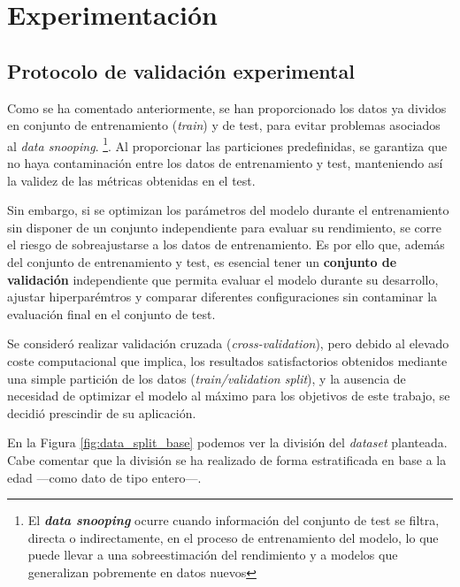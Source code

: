 \chapter{Experimentación}


\section{Protocolo de validación experimental}

Como se ha comentado anteriormente, se han proporcionado los datos ya dividos en conjunto de entrenamiento
(\textit{train}) y de test, para evitar problemas asociados al \textit{data snooping}. 
\footnote{El \textbf{\textit{data snooping}} ocurre cuando información del conjunto de test se filtra, directa o 
indirectamente, en el proceso de entrenamiento del modelo, lo que puede llevar a una sobreestimación del 
rendimiento y a modelos que generalizan pobremente en datos nuevos
}.
Al proporcionar las particiones predefinidas, se garantiza que no haya contaminación entre los datos de 
entrenamiento y test, manteniendo así la validez de las métricas obtenidas en el test. 

Sin embargo, si se optimizan los parámetros del modelo durante el entrenamiento sin disponer de un conjunto 
independiente para evaluar su rendimiento, se corre el riesgo de sobreajustarse a los datos de entrenamiento.
Es por ello que, además del conjunto de entrenamiento y test, es esencial tener un \textbf{conjunto de 
validación} independiente que permita evaluar el modelo durante su desarrollo, ajustar hiperparémtros y 
comparar diferentes configuraciones sin contaminar la evaluación final en el conjunto de test.

Se consideró realizar validación cruzada (\textit{cross-validation}), pero debido al elevado coste 
computacional que implica, los resultados satisfactorios obtenidos mediante una simple partición de los datos 
(\textit{train/validation split}), y la ausencia de necesidad de optimizar el modelo al máximo para los 
objetivos de este trabajo, se decidió prescindir de su aplicación.

En la Figura \ref{fig:data_split_base} podemos ver la división del \textit{dataset} planteada. Cabe comentar
que la división se ha realizado de forma estratificada en base a la edad ---como dato de tipo entero---.

